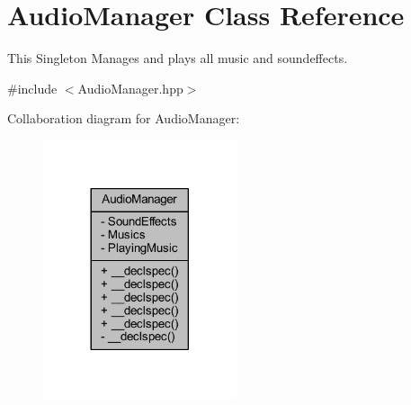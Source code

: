 \hypertarget{class_audio_manager}{\section{Audio\-Manager Class Reference}
\label{class_audio_manager}
}


This Singleton Manages and plays all music and soundeffects.  




{\ttfamily \#include $<$Audio\-Manager.\-hpp$>$}



Collaboration diagram for Audio\-Manager\-:\nopagebreak
\begin{figure}[H]
\begin{center}
\leavevmode
\includegraphics[width=161pt]{class_audio_manager__coll__graph}
\end{center}
\end{figure}
